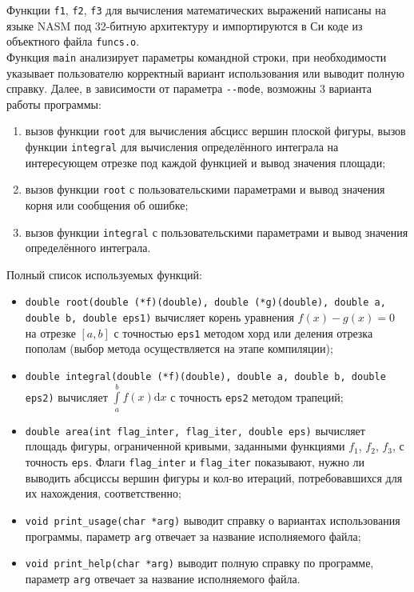 \documentclass[a4paper,12pt,titlepage,finall]{article}
\begin{document}
Функции \texttt{f1}, \texttt{f2}, \texttt{f3} для вычисления математических выражений написаны на языке NASM под 32-битную архитектуру и импортируются в Си коде из объектного файла \texttt{funcs.o}.\\

Функция \texttt{main} анализирует параметры командной строки, при необходимости указывает пользователю корректный вариант использования или выводит полную справку. Далее, в зависимости от параметра \texttt{-{}-mode}, возможны 3 варианта работы программы:
\begin{enumerate}
\item вызов функции \texttt{root} для вычисления абсцисс вершин плоской фигуры, вызов функции \texttt{integral} для вычисления определённого интеграла на интересующем отрезке под каждой функцией и вывод значения площади;
\item вызов функции \texttt{root} с пользовательскими параметрами и вывод значения корня или сообщения об ошибке;
\item вызов функции \texttt{integral} с пользовательскими параметрами и вывод значения определённого интеграла.
\end{enumerate}

Полный список используемых функций:
\begin{itemize}
\item \texttt{double root(double (*f)(double), double (*g)(double), double a, double b, double eps1)} вычисляет корень уравнения $f(x) - g(x) = 0$ на отрезке $[a,b]$ с точностью \texttt{eps1} методом хорд или деления отрезка пополам (выбор метода осуществляется на этапе компиляции);
\item \texttt{double integral(double (*f)(double), double a, double b, double eps2)} вычисляет $\int \limits_a^b f(x) \mathrm{d}x$ с точность \texttt{eps2} методом трапеций;
\item \texttt{double area(int flag\_inter, flag\_iter, double eps)} вычисляет площадь фигуры, ограниченной кривыми, заданными функциями $f_1$, $f_2$, $f_3$, с точность \texttt{eps}. Флаги \texttt{flag\_inter} и \texttt{flag\_iter} показывают, нужно ли выводить абсциссы вершин фигуры и кол-во итераций, потребовавшихся для их нахождения, соответственно;
\item \texttt{void print\_usage(char *arg)} выводит справку о вариантах использования программы, параметр \texttt{arg} отвечает за название исполняемого файла;
\item \texttt{void print\_help(char *arg)} выводит полную справку по программе, параметр \texttt{arg} отвечает за название исполняемого файла.
\end{itemize}
\end{document}
